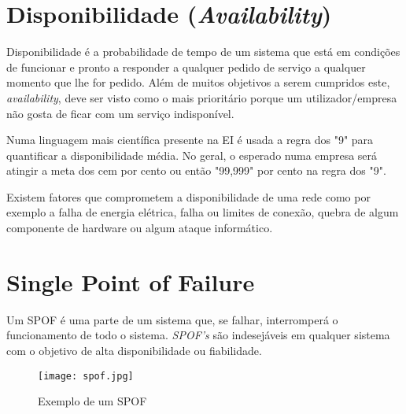 



\section{Disponibilidade (\textit{Availability})}
Disponibilidade é a probabilidade de tempo de um sistema que está em condições de funcionar e pronto a responder a qualquer pedido de serviço a qualquer momento que lhe for pedido. Além de muitos objetivos a serem cumpridos este, \textit{availability}, deve ser visto como o mais prioritário porque um utilizador/empresa não gosta de ficar com um serviço indisponível.

Numa linguagem mais científica presente na \ac{EI} é usada a regra dos "9" para quantificar a disponibilidade média. No geral, o esperado numa empresa será atingir a meta dos cem por cento ou então "99,999" por cento na regra dos "9".

Existem fatores que comprometem a disponibilidade de uma rede como por exemplo a falha de energia elétrica, falha ou limites de conexão, quebra de algum componente de hardware ou algum ataque informático.


\section{Single Point of Failure}
Um \ac{SPOF} é uma parte de um sistema que, se falhar, interromperá o funcionamento de todo o sistema. \textit{SPOF's} são indesejáveis em qualquer sistema com o objetivo de alta disponibilidade ou fiabilidade.

\vspace{1cm}

\begin{figure}[H]
\center
\texttt{[image: spof.jpg]}
\caption{Exemplo de um \ac{SPOF}}
\end{figure}
